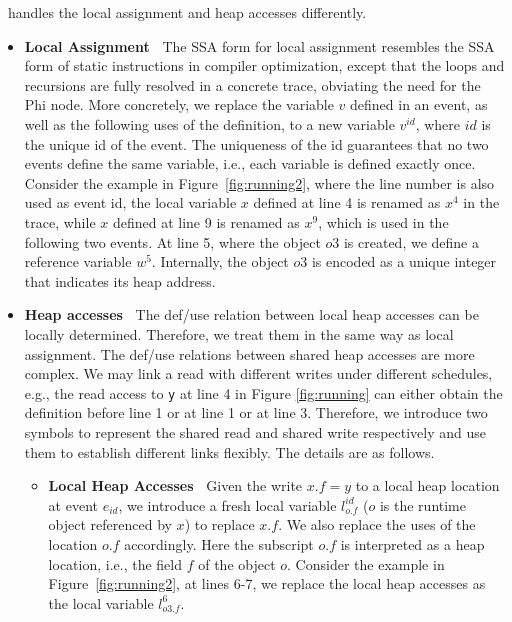 \tool\ handles the local assignment and heap accesses differently.
\begin{itemize}
\item {\bf Local Assignment\ } The SSA form for local assignment resembles the SSA form of static instructions in compiler optimization, except that the loops and recursions are fully resolved in a concrete trace, obviating the need for the {\sf Phi} node. More concretely, we replace the variable $v$ defined in an event, as well as the following uses of the definition, to a new variable $v^{id}$, where $id$ is the unique id of the event. The uniqueness of the id guarantees that no two events define the same variable, i.e., each variable is defined exactly once.  Consider the example in Figure~\ref{fig:running2}, where the line number is also used as event id,  the local variable $x$ defined at line 4 is renamed as $x^4$ in the trace, while $x$ defined at line 9 is renamed as $x^9$, which is used in the following two events.  At line 5, where the object $o3$ is created,  we define a reference variable $w^5$.  Internally,  the object $o3$ is encoded as a unique integer that indicates its heap address.
\item {\bf Heap accesses\ } The def/use relation between local heap accesses can be locally determined. Therefore, we treat them in the same way as local assignment. The def/use relations between shared heap accesses are more complex. We may link a read with different writes under different schedules, e.g., the read access to {\tt y} at line 4 in Figure \ref{fig:running} can either obtain the definition before line 1 or at line 1 or at line 3. Therefore, we introduce two symbols to represent the shared read and shared write respectively and use them to establish different links flexibly. The details are as follows. 
\begin{itemize}
\item {\bf Local Heap Accesses\ } Given the write $x.f=y$ to a local heap location at event $e_{id}$,  we introduce a fresh local variable {\tt $l^{id}_{o.f}$} ($o$ is the runtime object referenced by $x$) to replace $x.f$. We also replace the uses of the location $o.f$ accordingly.
Here  the subscript $o.f$ is interpreted as a heap location, i.e., the field $f$ of the object $o$. Consider the example in Figure~\ref{fig:running2}, at lines 6-7, we replace the local heap accesses as the local variable $l^6_{o3.f}$.

\end{itemize}
\end{itemize}
